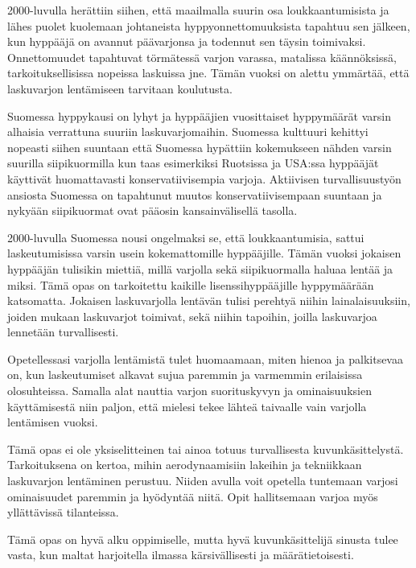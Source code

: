 2000-luvulla herättiin siihen, että maailmalla suurin osa loukkaantumisista ja lähes puolet kuolemaan johtaneista hyppyonnettomuuksista tapahtuu sen jälkeen, kun hyppääjä on avannut päävarjonsa ja todennut sen täysin toimivaksi. Onnettomuudet tapahtuvat törmätessä varjon varassa, matalissa käännöksissä, tarkoituksellisissa nopeissa laskuissa jne. Tämän vuoksi on alettu ymmärtää, että laskuvarjon lentämiseen tarvitaan koulutusta.  


Suomessa hyppykausi on lyhyt ja hyppääjien vuosittaiset hyppymäärät varsin alhaisia verrattuna suuriin laskuvarjomaihin. Suomessa kulttuuri kehittyi nopeasti siihen suuntaan että Suomessa hypättiin kokemukseen nähden varsin suurilla siipikuormilla kun taas esimerkiksi Ruotsissa ja USA:ssa hyppääjät käyttivät huomattavasti konservatiivisempia varjoja. Aktiivisen turvallisuustyön ansiosta Suomessa on tapahtunut muutos konservatiivisempaan suuntaan ja nykyään siipikuormat ovat pääosin kansainvälisellä tasolla. 


2000-luvulla Suomessa nousi ongelmaksi se, että loukkaantumisia, sattui laskeutumisissa varsin usein kokemattomille hyppääjille. Tämän vuoksi jokaisen hyppääjän tulisikin miettiä, millä varjolla sekä siipikuormalla haluaa lentää ja miksi. Tämä opas on tarkoitettu kaikille lisenssihyppääjille hyppymäärään katsomatta. Jokaisen laskuvarjolla lentävän tulisi perehtyä niihin lainalaisuuksiin, joiden mukaan laskuvarjot toimivat, sekä niihin tapoihin, joilla laskuvarjoa lennetään turvallisesti.  


Opetellessasi varjolla lentämistä tulet huomaamaan, miten hienoa ja palkitsevaa on, kun laskeutumiset alkavat sujua paremmin ja varmemmin erilaisissa olosuhteissa. Samalla alat nauttia varjon suorituskyvyn ja ominaisuuksien käyttämisestä niin paljon, että mielesi tekee lähteä taivaalle vain varjolla lentämisen vuoksi. 


Tämä opas ei ole yksiselitteinen tai ainoa totuus turvallisesta kuvunkäsittelystä. Tarkoituksena on kertoa, mihin aerodynaamisiin lakeihin ja tekniikkaan laskuvarjon lentäminen perustuu. Niiden avulla voit opetella tuntemaan varjosi ominaisuudet paremmin ja hyödyntää niitä. Opit hallitsemaan varjoa myös yllättävissä tilanteissa.  


Tämä opas on hyvä alku oppimiselle, mutta hyvä kuvunkäsittelijä sinusta tulee vasta, kun maltat harjoitella ilmassa kärsivällisesti ja määrätietoisesti. 


